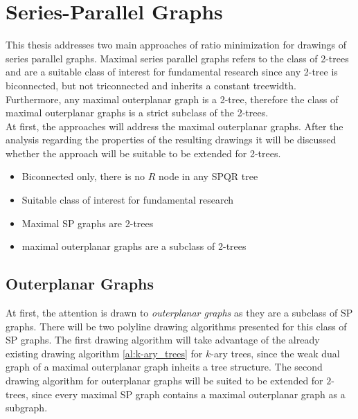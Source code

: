 \section{Series-Parallel Graphs}\label{section:SP-graphs}

This thesis addresses two main approaches of ratio minimization for drawings of series parallel graphs. Maximal series parallel graphs refers to the class of 2-trees %
and are a suitable class of interest for fundamental research since any 2-tree is biconnected, but not triconnected and inherits a constant treewidth. Furthermore, any maximal outerplanar graph is a 2-tree, therefore the class of maximal outerplanar graphs is a strict subclass of the 2-trees.\\
At first, the approaches will address the maximal outerplanar graphs. After the analysis regarding the properties of the resulting drawings it will be discussed whether the approach will be suitable to be extended for 2-trees.

\begin{itemize}
	\item Biconnected only, there is no $R$ node in any SPQR tree
	\item Suitable class of interest for fundamental research
	\item Maximal SP graphs are 2-trees
	\item maximal outerplanar graphs are a subclass of 2-trees
\end{itemize}

\subsection{Outerplanar Graphs}

At first, the attention is drawn to \emph{outerplanar graphs} as they are a subclass of SP graphs. There will be two polyline drawing algorithms presented for this class of SP graphs. The first drawing algorithm will take advantage of the already existing drawing algorithm \ref{al:k-ary_trees} for $k$-ary trees, since the weak dual graph of a maximal outerplanar graph inheits a tree structure. The second drawing algorithm for outerplanar graphs will be suited to be extended for $2$-trees, since every maximal SP graph contains a maximal outerplanar graph as a subgraph.


